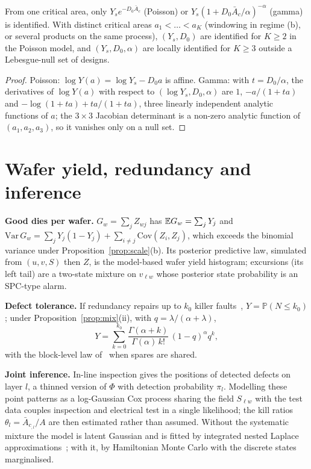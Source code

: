 \documentclass[10pt,twocolumn]{article}
\newcommand{\Ac}{\bar A_c}
\newcommand{\Prob}{\mathbb{P}}
\begin{document}
\begin{proposition}[identifiability]
From one critical area, only $Y_se^{-D_0\Ac}$ (Poisson) or $Y_s(1+D_0\Ac/\alpha)^{-\alpha}$ (gamma) is identified. With distinct critical areas $a_1<\dots<a_K$ (windowing in regime (b), or several products on the same process), $(Y_s,D_0)$ are identified for $K\ge2$ in the Poisson model, and $(Y_s,D_0,\alpha)$ are locally identified for $K\ge3$ outside a Lebesgue-null set of designs.
\end{proposition}
\begin{proof}
Poisson: $\log Y(a)=\log Y_s-D_0a$ is affine. Gamma: with $t=D_0/\alpha$, the derivatives of $\log Y(a)$ with respect to $(\log Y_s,D_0,\alpha)$ are $1$, $-a/(1+ta)$ and $-\log(1+ta)+ta/(1+ta)$, three linearly independent analytic functions of $a$; the $3\times3$ Jacobian determinant is a non-zero analytic function of $(a_1,a_2,a_3)$, so it vanishes only on a null set.
\end{proof}

\section{Wafer yield, redundancy and inference}
\textbf{Good dies per wafer.} $G_w=\sum_jZ_{wj}$ has $\mathbb{E} G_w=\sum_jY_j$ and $\mathrm{Var}\,G_w=\sum_jY_j(1-Y_j)+\sum_{i\neq j}\mathrm{Cov}(Z_i,Z_j)$, which exceeds the binomial variance under Proposition~\ref{prop:scale}(b). Its posterior predictive law, simulated from $(u,v,S)$ then $Z$, is the model-based wafer yield histogram; excursions (its left tail) are a two-state mixture on $v_{\ell w}$ whose posterior state probability is an SPC-type alarm.

\textbf{Defect tolerance.} If redundancy repairs up to $k_0$ killer faults~\cite{koren1998}, $Y=\Prob(N\le k_0)$; under Proposition~\ref{prop:mix}(ii), with $q=\lambda/(\alpha+\lambda)$,
\begin{equation}
Y=\sum_{k=0}^{k_0}\frac{\Gamma(\alpha+k)}{\Gamma(\alpha)\,k!}\,(1-q)^\alpha q^k ,
\end{equation}
with the block-level law of~\cite{koren1993} when spares are shared.

\textbf{Joint inference.} In-line inspection gives the positions of detected defects on layer $l$, a thinned version of $\Phi$ with detection probability $\pi_l$. Modelling these point patterns as a log-Gaussian Cox process sharing the field $S_{\ell w}$ with the test data couples inspection and electrical test in a single likelihood; the kill ratios $\theta_l=\Ac_{,l}/A$ are then estimated rather than assumed. Without the systematic mixture the model is latent Gaussian and is fitted by integrated nested Laplace approximations~\cite{rue2009}; with it, by Hamiltonian Monte Carlo with the discrete states marginalised.
\end{document}
